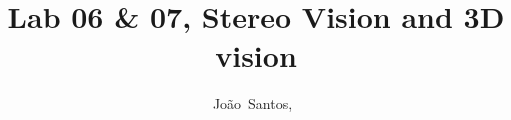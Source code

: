 \documentclass[journal]{IEEEtran}
\begin{document}
%
\title{Lab 06 \& 07, Stereo Vision and 3D vision}
%
%
%

\author{João~Santos,~}


% 
%
\end{document}
